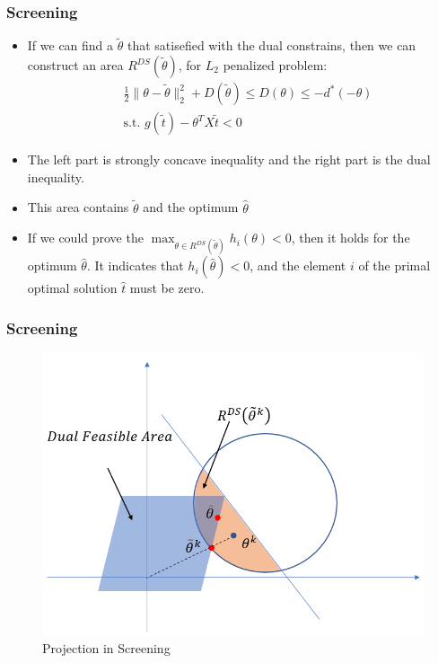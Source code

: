 \documentclass[dvipdfmx,cjk,t,10pt]{beamer}
\begin{document}
\begin{frame}
\frametitle{Screening}	
		\begin{itemize}
		\item If we can find a $\tilde{\theta}$ that satisefied with the dual constrains, then we can construct an area $R^{DS}(\tilde{\theta})$, for $L_2$ penalized problem:
		$$
	\begin{aligned}
	&\frac{1}{2}\| \theta -\tilde{\theta}\|_2^{2} + D(\tilde{\theta}) \leq D(\theta) \leq -d^{*}(-\theta) \\
	& \text{s.t. } g(\tilde{t})-\theta^{T}X\tilde{t}< 0
	\end{aligned}
	$$
		\item The left part is strongly concave inequality and the right part is the dual inequality. 
		\item This area contains $\tilde{\theta}$ and the optimum $\hat{\theta}$
		\item If we could prove the $\max_{\theta \in R^{DS}(\tilde{\theta}) } h_{i}(\theta)<0$, then it holds for the optimum $\hat{\theta}$. It indicates that $ h_{i}(\hat{\theta})<0$, and the element $i$ of the primal optimal solution $\hat{t}$ must be zero. 
		\end{itemize}
\end{frame}


\begin{frame}
\frametitle{Screening}
	\begin{figure}[htbp]
	\begin{center}	
	\includegraphics[width=0.8\hsize]{pic/proj}
	\caption{Projection in Screening}
	\end{center}	
	\end{figure}	
\end{frame}
\end{document}
